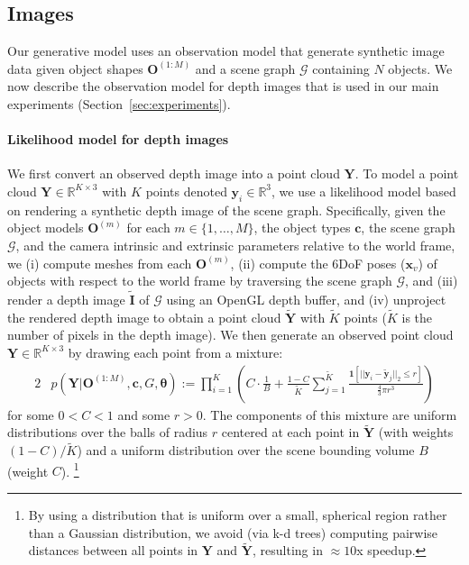 \subsection{Images} \label{sec:images}

Our generative model uses an observation model that generate synthetic image data
given object shapes $\mathbf{O}^{(1:M)}$ and a scene graph $\mathcal{G}$ containing $N$ objects.
We now describe the observation model for depth images that is used in our main experiments (Section~\ref{sec:experiments}).


\paragraph{Likelihood model for depth images}

We first convert an observed depth image into a point cloud $\mathbf{Y}$.
To model a point cloud $\mathbf{Y} \in \mathbb{R}^{K \times 3}$ with $K$ points denoted $\mathbf{y}_i \in \mathbb{R}^3$, we use a likelihood model based on rendering a synthetic depth image of the scene graph.
Specifically, given the object models $\mathbf{O}^{(m)}$ for each $m \in \{1, \ldots, M\}$, the object types $\mathbf{c}$, the scene graph $\mathcal{G}$, and the camera intrinsic and extrinsic parameters relative to the world frame,
we (i) compute meshes from each $\mathbf{O}^{(m)}$, (ii) compute the 6DoF poses ($\mathbf{x}_v$) of objects with respect to the world frame by traversing the scene graph $\mathcal{G}$, 
and (iii) render a depth image $\tilde{\mathbf{I}}$ of $\mathcal{G}$ using an OpenGL depth buffer, and
(iv) unproject the rendered depth image to obtain a point cloud $\tilde{\mathbf{Y}}$
with $\tilde{K}$ points ($\tilde{K}$ is the number of pixels in the depth image).
We then generate an observed point cloud $\mathbf{Y} \in \mathbb{R}^{K \times 3}$ by drawing each point from a mixture:
\begin{alignat}{2}
&p(\mathbf{Y} | \mathbf{O}^{(1:M)}, \mathbf{c}, G, \bm{\theta}) := \prod_{i = 1}^{K} \left( C \cdot \frac{1}{B} + \frac{1-C}{\tilde{K}} \sum_{j=1}^{\tilde{K}}
\frac{ \mathbf{1}[||\mathbf{y}_i - \tilde{\mathbf{y}}_{j}||_2 \leq r]}{\frac{4}{3} \pi r^3}\right)
\label{eq:likelihood}
\end{alignat}
for some $0 < C < 1$ and some $r > 0$.
The components of this mixture are uniform distributions over the balls of radius $r$ centered at each point in $\tilde{\mathbf{Y}}$ (with weights $(1-C)/\tilde{K}$) and
a uniform distribution over the scene bounding volume $B$ (weight $C$).%
\footnote{By using a distribution that is uniform over a small, spherical region rather than a Gaussian distribution, we avoid (via k-d trees) computing pairwise distances between all points in $\mathbf{Y}$ and $\tilde{\mathbf{Y}}$, resulting in  $\approx10$x speedup.}

